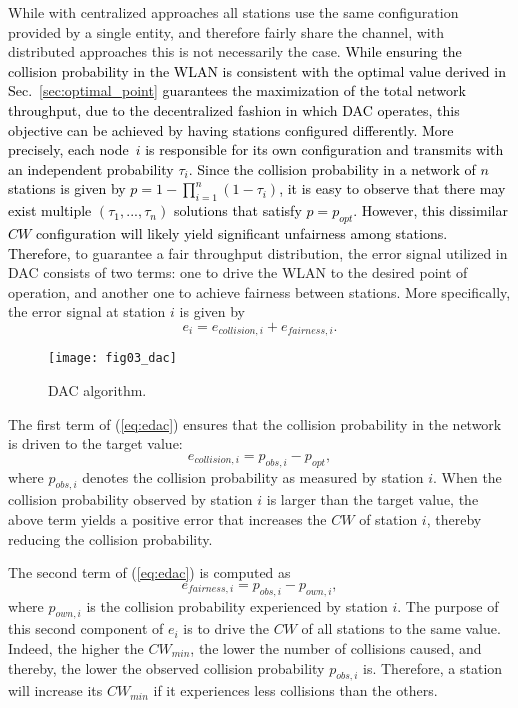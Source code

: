 \documentclass[a4paper,10pt]{article}
\newcommand{\revs}[1]{\textcolor{black}{#1}}
\begin{document}
While with centralized approaches all stations use the same configuration provided by a single entity, and therefore fairly share the channel, with distributed approaches this is not necessarily the case. \revs{While ensuring the collision probability in the WLAN is consistent with the optimal value derived in Sec.~\ref{sec:optimal_point} guarantees the maximization of the total network throughput, due to the decentralized fashion in which DAC operates, this objective can be achieved by having stations configured differently. More precisely, each node~$i$ is responsible for its own configuration and transmits with an independent probability $\tau_i$. Since the collision probability in a network of $n$ stations is given by $p=1-\prod_{i=1}^n(1-\tau_i)$, it is easy to observe that there may exist multiple $(\tau_1,...,\tau_n)$ solutions that satisfy $p=p_{opt}$. However, this dissimilar $CW$ configuration will likely yield significant unfairness among stations. Therefore,} to guarantee a fair throughput distribution, the error signal utilized in DAC consists of two terms: one to drive the WLAN to the desired point of operation, and another one to achieve fairness between stations. More specifically, the error signal at station $i$ is given by
\begin{equation}
\label{eq:edac}
e_i = e_{collision,i} + e_{fairness,i}.
\end{equation}

\begin{figure}\texttt{[image: fig03\_dac]}\caption{DAC algorithm.}\label{fig:dac}\end{figure}

The first term of (\ref{eq:edac}) ensures that the collision probability in the network is driven to the target value:
\begin{equation}
e_{collision,i} = p_{obs,i} - p_{opt},
\end{equation}
where $p_{obs,i}$ denotes the collision probability as measured by station $i$. When the collision probability observed by station $i$ is larger than the target value, the above term yields a positive error that increases the $CW$ of station $i$, thereby reducing the collision probability.

The second term of (\ref{eq:edac}) is computed as
\begin{equation}
\label{eq:efair}
e_{fairness,i} = p_{obs,i} - p_{own,i},
\end{equation}
where $p_{own,i}$ is the collision probability experienced by station $i$. The purpose of this second component of $e_i$ is to drive the $CW$ of all stations to the same value. Indeed, the higher the $CW_{min}$, the lower the number of collisions caused, and thereby, the lower the observed collision probability $p_{obs,i}$ is. Therefore, a station will increase its $CW_{min}$ if it experiences less collisions than the others.
\end{document}

